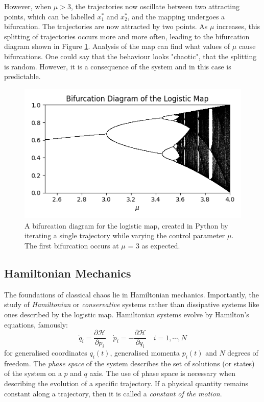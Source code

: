 \documentclass[12pt,a4paper]{amsart}
\begin{document}

However, when $\mu > 3$, the trajectories now oscillate between two attracting points, which can be labelled $x_{1}^{*}$ and $x_{2}^{*}$, and the mapping undergoes a bifurcation. The trajectories are now attracted by two points. As $\mu$ increases, this splitting of trajectories occurs more and more often, leading to the bifurcation diagram shown in Figure \ref{fig:bif}. Analysis of the map can find what values of $\mu$ cause bifurcations. One could say that the behaviour looks "chaotic", that the splitting is random. However, it is a consequence of the system and in this case is predictable.

\begin{figure}[h] 
    \centering
    \includegraphics[scale=0.8]{logistic_map_bifur.png}
    \caption{A bifurcation diagram for the logistic map, created in Python by iterating a single trajectory while varying the control parameter $\mu$. The first bifurcation occurs at $\mu$ = 3 as expected.}
    \label{fig:bif}
\end{figure}

\newpage

\subsection{Hamiltonian Mechanics}

The foundations of classical chaos lie in Hamiltonian mechanics. Importantly, the study of \textit{Hamiltonian} or \textit{conservative} systems rather than dissipative systems like ones described by the logistic map. Hamiltonian systems evolve by Hamilton's equations, famously:
$$\dot{q}_{i} = \frac{\partial \mathcal{H}}{\partial p_{i}} \quad \dot{p}_{i} = -\frac{\partial \mathcal{H}}{\partial q_{i}} \quad i = 1, \cdots , N$$
for generalised coordinates $q_{i}(t)$, generalised momenta $p_{i}(t)$ and $N$ degrees of freedom. The \textit{phase space} of the system describes the set of solutions (or states) of the system on a $p$ and $q$ axis. The use of phase space is necessary when describing the evolution of a specific trajectory. If a physical quantity remains constant along a trajectory, then it is called a \textit{constant of the motion}. 
\end{document}
